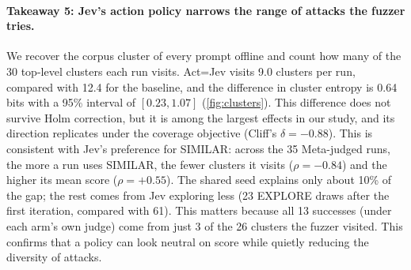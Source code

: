 \documentclass{article}
\newcommand{\para}[1]{\paragraph{#1}}
\begin{document}
\para{Takeaway 5: Jev's action policy narrows the range of attacks the fuzzer tries.}
We recover the corpus cluster of every prompt offline and count how many of the 30 top-level clusters each run visits.
Act=Jev visits 9.0 clusters per run, compared with 12.4 for the baseline, and the difference in cluster entropy is 0.64 bits with a 95\% interval of $[0.23, 1.07]$ (\autoref{fig:clusters}).
This difference does not survive Holm correction, but it is among the largest effects in our study, and its direction replicates under the coverage objective (Cliff's $\delta = -0.88$).
This is consistent with Jev's preference for SIMILAR: across the 35 Meta-judged runs, the more a run uses SIMILAR, the fewer clusters it visits ($\rho = -0.84$) and the higher its mean score ($\rho = +0.55$).
The shared seed explains only about 10\% of the gap; the rest comes from Jev exploring less (23 EXPLORE draws after the first iteration, compared with 61).
This matters because all 13 successes (under each arm's own judge) come from just 3 of the 26 clusters the fuzzer visited.
This confirms that a policy can look neutral on score while quietly reducing the diversity of attacks.
\end{document}
